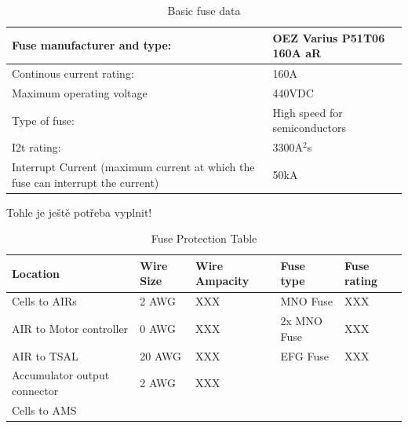 \begin{table}[H]
	\centering
	\caption{Basic fuse data}
	\begin{tabularx}{\textwidth}{|X|X|}
		\hline
		Fuse manufacturer and type: & OEZ Varius P51T06 160A aR \\[\TableSize]
		\hline
		Continous current rating:  & 160A \\[\TableSize]
		\hline
		Maximum operating voltage  & 440VDC \\[\TableSize]
		\hline
		Type of fuse: & High speed for semiconductors \\[\TableSize]
		\hline
		I2t rating: & 3300A$^{2}$s \\[\TableSize]
		\hline
		Interrupt Current (maximum current at which the fuse can interrupt the current) & 50kA \\[\TableSize]
		\hline
	\end{tabularx}%
	\label{tab:acc-fuse}%
\end{table}%


Tohle je ještě potřeba vyplnit!

\begin{table}[H]
	\centering
	\caption{Fuse Protection Table}
	\begin{tabularx}{\textwidth}{|X|X|X|X|X|}
		\hline
		Location & Wire Size & Wire Ampacity & Fuse type & Fuse rating\\[\TableSize]
		\hline
		Cells to AIRs & 2 AWG & XXX & MNO Fuse & XXX \\[\TableSize]
		\hline
		AIR to Motor controller & 0 AWG & XXX & 2x MNO Fuse & XXX \\[\TableSize]
		\hline
		AIR to TSAL & 20 AWG & XXX & EFG Fuse & XXX \\[\TableSize]
		\hline
		Accumulator output connector & 2 AWG & XXX &     &  \\[\TableSize]
		\hline
		Cells to AMS &     &     &     &  \\[\TableSize]
		\hline
	\end{tabularx}%
	\label{tab:acc-fuse-protection}%
\end{table}%

